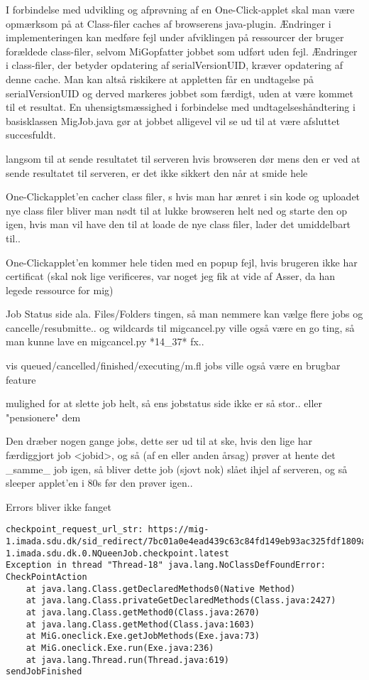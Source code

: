 \documentclass[pdf,draft,a4paper,11pt]{article}
\newcommand{\mig}{MiG}
\newcommand{\oc}{One-Click}
\begin{document}
I forbindelse med udvikling og afprøvning af en \oc-applet skal man være opmærksom på at Class-filer caches af browserens java-plugin. Ændringer i implementeringen kan medføre fejl under afviklingen på ressourcer der bruger forældede class-filer, selvom \mig opfatter jobbet som udført uden fejl. Ændringer i class-filer, der betyder opdatering af serialVersionUID, kræver opdatering af denne cache. Man kan altså riskikere at appletten får en undtagelse på serialVersionUID og derved markeres jobbet som færdigt, uden at være kommet til et resultat. En uhensigtsmæssighed i forbindelse med undtagelseshåndtering i basisklassen MigJob.java gør at jobbet alligevel vil se ud til at være afsluttet succesfuldt. 

langsom til at sende resultatet til serveren hvis browseren dør mens den er ved
at sende resultatet til serveren, er det ikke sikkert den når at smide hele

\oc applet'en cacher class filer, s hvis man har ænret i sin kode og
uploadet nye class filer bliver man nødt til at lukke browseren helt ned og
starte den op igen, hvis man vil have den til at loade de nye class filer, lader
det umiddelbart til.. 

\oc applet'en kommer hele tiden med en popup fejl, hvis brugeren ikke har
certificat (skal nok lige verificeres, var noget jeg fik at vide af Asser, da
han legede ressource for mig) 

Job Status side ala. Files/Folders
tingen, så man nemmere kan vælge flere jobs og cancelle/resubmitte.. og
wildcards til migcancel.py ville også være en go ting, så man kunne lave en
migcancel.py *14\_37* fx.. 

vis queued/cancelled/finished/executing/m.fl jobs ville også være en brugbar feature

mulighed for at slette job helt, så ens jobstatus side ikke er så stor.. eller
"pensionere" dem

Den dræber nogen gange jobs, dette ser ud til at ske, hvis den lige har
færdiggjort job <jobid>, og så (af en eller anden årsag) prøver at hente det
\_samme\_ job igen, så bliver dette job (sjovt nok) slået ihjel af serveren, og
så sleeper applet'en i 80s før den prøver igen.. 

Errors bliver ikke fanget
\begin{verbatim}
checkpoint_request_url_str: https://mig-1.imada.sdu.dk/sid_redirect/7bc01a0e4ead439c63c84fd149eb93ac325fdf1809aedc23049c010890bf14bd/13768_6_2_2007__8_42_57_mig-1.imada.sdu.dk.0.NQueenJob.checkpoint.latest
Exception in thread "Thread-18" java.lang.NoClassDefFoundError: CheckPointAction
	at java.lang.Class.getDeclaredMethods0(Native Method)
	at java.lang.Class.privateGetDeclaredMethods(Class.java:2427)
	at java.lang.Class.getMethod0(Class.java:2670)
	at java.lang.Class.getMethod(Class.java:1603)
	at MiG.oneclick.Exe.getJobMethods(Exe.java:73)
	at MiG.oneclick.Exe.run(Exe.java:236)
	at java.lang.Thread.run(Thread.java:619)
sendJobFinished
\end{verbatim}
\end{document}
